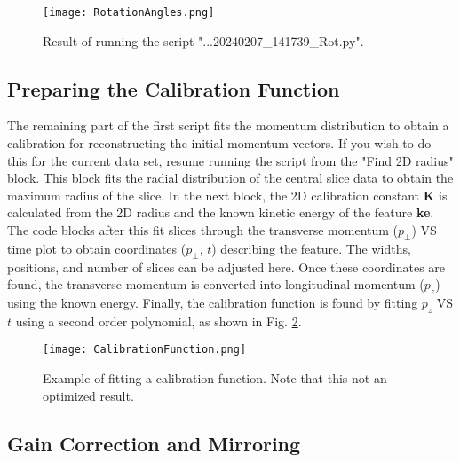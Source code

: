 \documentclass[12pt]{article}
\begin{document}
\begin{figure}
\centering
\texttt{[image: RotationAngles.png]}
\caption{
Result of running the script "...20240207\_141739\_Rot.py".
}\label{fig:RotationAngles}
\end{figure}

\subsection{Preparing the Calibration Function}

The remaining part of the first script fits the momentum distribution to obtain a calibration for reconstructing the initial momentum vectors.
If you wish to do this for the current data set, resume running the script from the "Find 2D radius" block.
This block fits the radial distribution of the central slice data to obtain the maximum radius of the slice.
In the next block, the 2D calibration constant \textbf{K} is calculated from the 2D radius and the known kinetic energy of the feature \textbf{ke}. 
The code blocks after this fit slices through the transverse momentum ($p_\perp$) VS time plot to obtain coordinates ($p_\perp$, $t$) describing the feature.
The widths, positions, and number of slices can be adjusted here.
Once these coordinates are found, the transverse momentum is converted into longitudinal momentum ($p_z$) using the known energy.
Finally, the calibration function is found by fitting $p_z$ VS $t$ using a second order polynomial, as shown in Fig. \ref{fig:CalibrationFunction}.

\begin{figure}
\centering
\texttt{[image: CalibrationFunction.png]}
\caption{
Example of fitting a calibration function. Note that this not an optimized result.
}\label{fig:CalibrationFunction}
\end{figure}

\subsection{Gain Correction and Mirroring}
\end{document}
